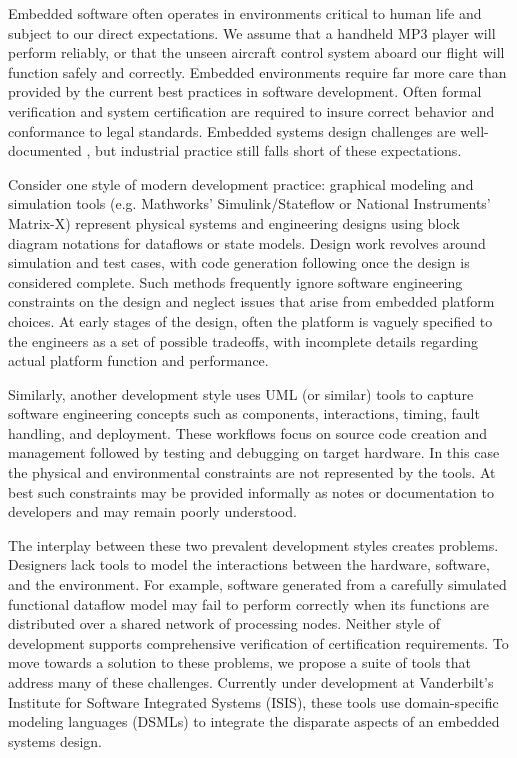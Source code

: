 Embedded software often operates in environments critical to human life
and subject to our direct expectations.  We assume that a handheld MP3 
player will perform reliably, or that the unseen aircraft control system
aboard our flight will function safely and correctly.  Embedded environments
require far more care than provided by the current best practices in software
development.  Often formal verification and system certification are required
to insure correct behavior and conformance to legal standards.  Embedded systems
design challenges are well-documented \cite{HenSif:2006}, but industrial 
practice still falls short of these expectations.

Consider one style of modern development practice: graphical modeling and
simulation tools (e.g. Mathworks' Simulink/Stateflow or National Instruments'
Matrix-X) represent physical systems and engineering designs using block 
diagram notations for dataflows or state models.  Design work revolves 
around simulation and test cases, with code generation following once the
design is considered complete.  Such methods frequently ignore software engineering
constraints on the design and neglect issues that arise from embedded 
platform choices.  At early stages of the design, often the platform 
is vaguely specified to the engineers as a set of possible tradeoffs, with
incomplete details regarding actual platform function and performance.

Similarly, another development style uses UML (or similar) tools to capture
software engineering concepts such as components, interactions, timing,
fault handling, and deployment.  These workflows focus on source code 
creation and management followed by testing and debugging on target hardware.
In this case the physical and environmental constraints are not represented
by the tools.  At best such constraints may be provided informally as notes or
documentation to developers and may remain poorly understood.

The interplay between these two prevalent development styles creates
problems.  Designers lack tools to model the interactions between the
hardware, software, and the environment.  For example, software 
generated from a carefully simulated functional dataflow model may 
fail to perform correctly when its functions are distributed over a 
shared network of processing nodes.  Neither style of development 
supports comprehensive verification of certification requirements.  To
move towards a solution to these problems, we propose a suite of tools
that address many of these challenges.  Currently under development at
Vanderbilt's Institute for Software Integrated Systems (ISIS), these 
tools use domain-specific modeling languages (DSMLs) to integrate the disparate
aspects of an embedded systems design.


